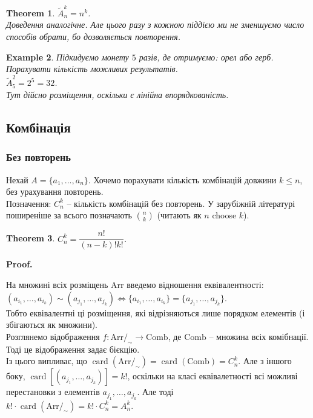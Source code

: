 \documentclass[a4paper, 14pt]{extarticle}
\makeatletter
\theoremstyle{theoremdd}
\newtheorem{theorem}{Theorem}[subsection]
\theoremstyle{theoremdd}
\theoremstyle{theoremdd}
\theoremstyle{theoremdd}
\theoremstyle{theoremdd}
\newtheorem{example}[theorem]{Example}
\theoremstyle{theoremdd}
\theoremstyle{theoremdd}
\theoremstyle{theoremdd}
\theoremstyle{theoremdd}
\theoremstyle{theoremdd}
\theoremstyle{theoremdd}
\theoremstyle{theoremdd}
\theoremstyle{theoremdd}
\theoremstyle{theoremdd}
\theoremstyle{theoremdd}
\renewenvironment{proof}[1][Proof.\\]{\par
\pushQED{\hfill \qed}%
\normalfont \topsep6\p@\@plus6\p@\relax
\trivlist
\item\relax
{\bfseries
#1\@addpunct{.}}\hspace\labelsep\ignorespaces
}{%
\popQED\endtrivlist\@endpefalse
}
\DeclareMathOperator{\card}{card}
\makeatother
\begin{document}
\begin{theorem}
$\tilde{A}_n^k = n^k$.\\
\textit{Доведення аналогічне. Але цього разу з кожною піддією ми не зменшуємо число способів обрати, бо дозволяється повторення.}
\end{theorem}

\begin{example}
Підкидуємо монету $5$ разів, де отримуємо: орел або герб. Порахувати кількість можливих результатів.\\
$\tilde{A}_5^2 = 2^5 = 32$.
\bigskip \\
Тут дійсно розміщення, оскільки є лінійна впорядкованість.
\end{example}

\subsection{Комбінація}
\subsubsection*{Без повторень}
Нехай $A = \{a_1,\dots,a_n\}$. Хочемо порахувати кількість комбінацій довжини $k \leq n$, без урахування повторень.\\
Позначення: $C_n^k$ -- кількість комбінацій без повторень. У зарубіжній літературі поширеніше за всього позначають $\binom{n}{k}$ (читають як $n$ choose $k$).

\begin{theorem}
$C_n^k = \dfrac{n!}{(n-k)! k!}$.
\end{theorem}

\begin{proof}
На множині всіх розміщень $\text{Arr}$ введемо відношення еквівалентності:\\
$(a_{i_1},\dots,a_{i_k}) \sim (a_{j_1},\dots,a_{j_k}) \iff \{a_{i_1},\dots,a_{i_k}\} = \{a_{j_1},\dots,a_{j_k}\}$.\\
Тобто еквівалентні ці розміщення, які відрізняються лише порядком елементів (і збігаються як множини). \\
Розглянемо відображення $f \colon \text{Arr}/_\sim \to \text{Comb}$, де $\text{Comb}$ -- множина всіх комібнації. Тоді це відображення задає бієкцію.\\
Із цього випливає, що $\card(\text{Arr}/_\sim) = \card(\text{Comb}) = C_n^k$. Але з іншого боку, $\card [(a_{j_1},\dots,a_{j_k})] = k!$, оскільки на класі еквівалетності всі можливі перестановки з елементів $a_{j_1},\dots,a_{j_k}$. Але тоді \\ $k! \cdot \card(\text{Arr}/_\sim) = k! \cdot C_n^k = A_n^k$.
\end{proof}
\end{document}
